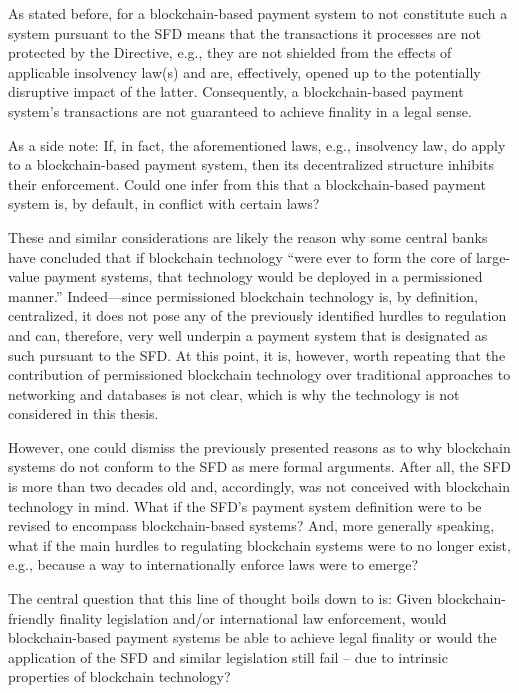 As stated before, for a blockchain-based payment system to not constitute such a system pursuant to the SFD means that the transactions it processes are not protected by the Directive, e.g., they are not shielded from the effects of applicable insolvency law(s) and are, effectively, opened up to the potentially disruptive impact of the latter.
Consequently, a blockchain-based payment system's transactions are not guaranteed to achieve finality in a legal sense.

As a side note:
If, in fact, the aforementioned laws, e.g., insolvency law, do apply to a blockchain-based payment system, then its decentralized structure inhibits their enforcement. 
Could one infer from this that a blockchain-based payment system is, by default, in conflict with certain laws?

These and similar considerations are likely the reason why some central banks have concluded that if blockchain technology ``were ever to form the core of large-value payment systems, that technology would be deployed in a permissioned manner.'' \autocite{liao2017}
Indeed---since permissioned blockchain technology is, by definition, centralized, it does not pose any of the previously identified hurdles to regulation and can, therefore, very well underpin a payment system that is designated as such pursuant to the SFD.
At this point, it is, however, worth repeating that the contribution of permissioned blockchain technology over traditional approaches to networking and databases is not clear, which is why the technology is not considered in this thesis.

However, one could dismiss the previously presented reasons as to why blockchain systems do not conform to the SFD as mere formal arguments.
After all, the SFD is more than two decades old and, accordingly, was not conceived with blockchain technology in mind.
What if the SFD's payment system definition were to be revised to encompass blockchain-based systems?
And, more generally speaking, what if the main hurdles to regulating blockchain systems were to no longer exist, e.g., because a way to internationally enforce laws were to emerge?

The central question that this line of thought boils down to is:
Given blockchain-friendly finality legislation and/or international law enforcement, would blockchain-based payment systems be able to achieve legal finality or would the application of the SFD and similar legislation still fail -- due to intrinsic properties of blockchain technology?

